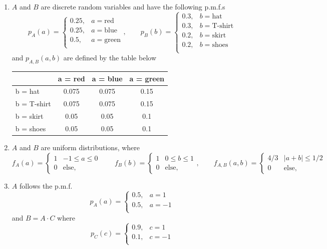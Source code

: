 \documentclass{article}
\begin{document}
\begin{enumerate}
\begin{enumerate}
\item $A$ and $B$ are discrete random variables and have the following p.m.f.s
\[
p_A(a) = \begin{cases}
0.25, & a = \text{red}\\
0.25, & a = \text{blue}\\
0.5, & a = \text{green}\\
\end{cases},
\qquad
p_B(b) = \begin{cases}
0.3, & b = \text{hat}\\
0.3, & b = \text{T-shirt}\\
0.2, & b = \text{skirt}\\
0.2, & b = \text{shoes}\\
\end{cases}
\]
and $p_{A,B}(a,b)$ are defined by the table below
\begin{center}
\begin{tabular}{l|ccc}
 & a = red & a = blue & a = green\\\hline
b = hat& 0.075 & 0.075 & 0.15\\
b = T-shirt& 0.075 & 0.075 & 0.15\\
b = skirt&0.05 & 0.05 & 0.1\\
b = shoes&0.05 & 0.05 & 0.1\\
\end{tabular} 
\end{center}



\item $A$ and $B$ are uniform distributions, where 
\[
f_A(a) = \begin{cases} 1 & -1 \leq a \leq 0 \\ 0 & \text{else,}
\end{cases}
\qquad
f_B(b) = \begin{cases} 1 & 0 \leq b \leq 1 \\ 0 & \text{else,}
\end{cases}, 
\qquad
f_{A,B}(a,b) = \begin{cases} 4/3 &  |a+b| \leq 1/2 \\ 0 & \text{else,}
\end{cases}
\]


\item $A$ follows the p.m.f.
\[
p_A(a) = \begin{cases}
0.5, & a = 1\\
0.5, & a = -1\\
\end{cases}
\]
and $B = A\cdot C$ where
\[
p_C(c) = \begin{cases}
0.9, & c = 1\\
0.1, & c = -1\\
\end{cases}
\]





\end{enumerate}
\end{enumerate}
\end{document}
